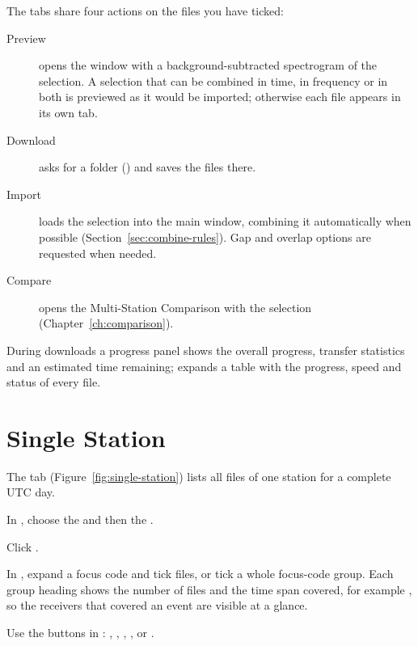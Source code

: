 The tabs share four actions on the files you have ticked:
\begin{description}
  \item[Preview] opens the  window with a background-subtracted
    spectrogram of the selection. A selection that can be combined in time, in frequency or
    in both is previewed as it would be imported; otherwise each file appears in its own
    tab.
  \item[Download] asks for a folder () and saves the files
    there.
  \item[Import] loads the selection into the main window, combining it automatically when
    possible (Section~\ref{sec:combine-rules}). Gap and overlap options are requested when
    needed.
  \item[Compare] opens the Multi-Station Comparison with the selection
    (Chapter~\ref{ch:comparison}).
\end{description}
During downloads a progress panel shows the overall progress, transfer statistics and an
estimated time remaining;  expands a table with the progress, speed
and status of every file.

\section{Single Station}
\label{sec:single-station}

The  tab (Figure~\ref{fig:single-station}) lists all files of one
station for a complete UTC day.


\begin{steps}
  \item In , choose the  and then the .
  \item Click .
  \item In , expand a focus
    code and tick files, or tick a whole focus-code group. Each group heading shows the
    number of files and the time span covered, for example
    , so the receivers that covered an event are
    visible at a glance.
  \item Use the buttons in : , ,
    , ,  or .
\end{steps}

